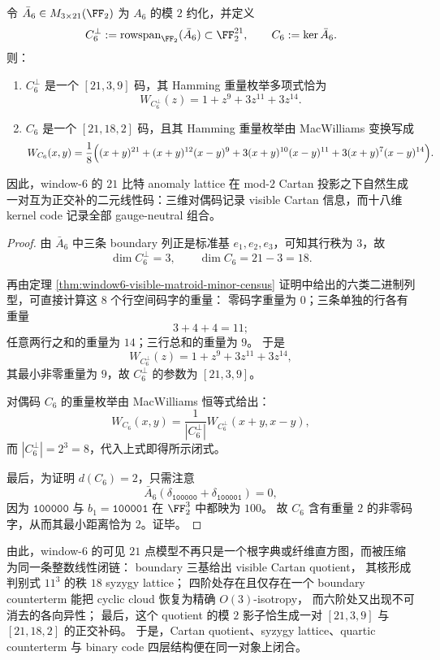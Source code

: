 \begin{theorem}\label{thm:window6-cartan-kernel-code-parameters}
令 \(\bar A_6\in M_{3\times 21}(\FF_2)\) 为 \(A_6\) 的模 \(2\) 约化，并定义
\[
C_6^\perp:=\operatorname{rowspan}_{\FF_2}(\bar A_6)\subset \FF_2^{21},
\qquad
C_6:=\ker \bar A_6.
\]
则：
\begin{enumerate}
  \item \(C_6^\perp\) 是一个 \([21,3,9]\) 码，其 Hamming 重量枚举多项式恰为
  \[
  W_{C_6^\perp}(z)=1+z^9+3z^{11}+3z^{14}.
  \]
  \item \(C_6\) 是一个 \([21,18,2]\) 码，且其 Hamming 重量枚举由 MacWilliams 变换写成
  \[
  W_{C_6}(x,y)
  =
  \frac18\Bigl(
  (x+y)^{21}
  +(x+y)^{12}(x-y)^9
  +3(x+y)^{10}(x-y)^{11}
  +3(x+y)^7(x-y)^{14}
  \Bigr).
  \]
\end{enumerate}
因此，window-\(6\) 的 \(21\) 比特 anomaly lattice 在 mod-\(2\) Cartan 投影之下自然生成一对互为正交补的二元线性码：三维对偶码记录 visible Cartan 信息，而十八维 kernel code 记录全部 gauge-neutral 组合。
\end{theorem}
\begin{proof}
由 \(\bar A_6\) 中三条 boundary 列正是标准基 \(e_1,e_2,e_3\)，可知其行秩为 \(3\)，故
\[
\dim C_6^\perp=3,
\qquad
\dim C_6=21-3=18.
\]

再由定理 \ref{thm:window6-visible-matroid-minor-census} 证明中给出的六类二进制列型，可直接计算这 \(8\) 个行空间码字的重量：
零码字重量为 \(0\)；三条单独的行各有重量
\[
3+4+4=11;
\]
任意两行之和的重量为 \(14\)；三行总和的重量为 \(9\)。
于是
\[
W_{C_6^\perp}(z)=1+z^9+3z^{11}+3z^{14},
\]
其最小非零重量为 \(9\)，故 \(C_6^\perp\) 的参数为 \([21,3,9]\)。

对偶码 \(C_6\) 的重量枚举由 MacWilliams 恒等式给出：
\[
W_{C_6}(x,y)
=
\frac1{|C_6^\perp|}
W_{C_6^\perp}(x+y,x-y),
\]
而 \(|C_6^\perp|=2^3=8\)，代入上式即得所示闭式。

最后，为证明 \(d(C_6)=2\)，只需注意
\[
\bar A_6(\delta_{\texttt{100000}}+\delta_{\texttt{100001}})=0,
\]
因为 \(\texttt{100000}\) 与 \(b_1=\texttt{100001}\) 在 \(\FF_2^3\) 中都映为 \(100\)。
故 \(C_6\) 含有重量 \(2\) 的非零码字，从而其最小距离恰为 \(2\)。证毕。
\end{proof}

\noindent
由此，window-\(6\) 的可见 \(21\) 点模型不再只是一个根字典或纤维直方图，而被压缩为同一条整数线性闭链：
boundary 三基给出 visible Cartan quotient，
其核形成判别式 \(11^3\) 的秩 \(18\) syzygy lattice；
四阶处存在且仅存在一个 boundary counterterm 能把 cyclic cloud 恢复为精确 \(O(3)\)-isotropy，
而六阶处又出现不可消去的各向异性；
最后，这个 quotient 的模 \(2\) 影子恰生成一对 \([21,3,9]\) 与 \([21,18,2]\) 的正交补码。
于是，Cartan quotient、syzygy lattice、quartic counterterm 与 binary code 四层结构便在同一对象上闭合。
